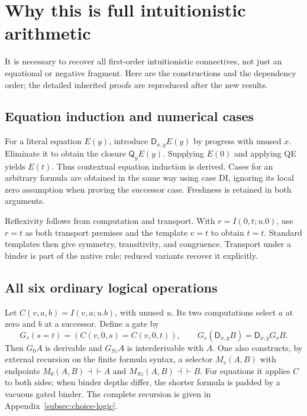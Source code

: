 \documentclass[11pt,letterpaper]{article}
\theoremstyle{definition}
\newcommand{\D}{\mathsf D}
\newcommand{\Q}{\mathsf Q}
\begin{document}
\section{Why this is full intuitionistic arithmetic}
\label{sec:main-bridge}

It is necessary to recover all first-order intuitionistic connectives,
not just an equational or negative fragment. Here are the constructions
and the dependency order; the detailed inherited proofs are reproduced
after the new results.

\subsection{Equation induction and numerical cases}

For a literal equation $E(y)$, introduce $\D_{x,y}E(y)$ by progress with
unused $x$. Eliminate it to obtain the closure $\Q_yE(y)$. Supplying
$E(0)$ and applying QE yields $E(t)$. Thus contextual equation induction is
derived. Cases for an arbitrary formula are obtained in the same way
using case DI, ignoring its local zero assumption when proving the
successor case. Freshness is retained in both arguments.

Reflexivity follows from computation and transport. With
$r=I(0,t;u.0)$, use $r=t$ as both transport premises and the template
$v=t$ to obtain $t=t$. Standard templates then give symmetry,
transitivity, and congruence. Transport under a binder is part of the
native rule; reduced variants recover it explicitly.

\subsection{All six ordinary logical operations}

Let $C(v,a,b)=I(v,a;u.b)$, with unused $u$. Its two computations select
$a$ at zero and $b$ at a successor. Define a gate by
\[
 G_v(s=t)=(C(v,0,s)=C(v,0,t)),\qquad
 G_v(\D_{x,y}B)=\D_{x,y}G_vB.
\]
Then $G_0A$ is derivable and $G_{Sz}A$ is interderivable with $A$.
One also constructs, by external recursion on the finite formula
syntax, a selector $M_v(A,B)$ with endpoints
$M_0(A,B)\dashv\vdash A$ and $M_{Sz}(A,B)\dashv\vdash B$.
For equations it applies $C$ to both sides; when binder depths differ,
the shorter formula is padded by a vacuous gated binder. The complete
recursion is given in Appendix~\ref{subsec:choice-logic}.
\end{document}
